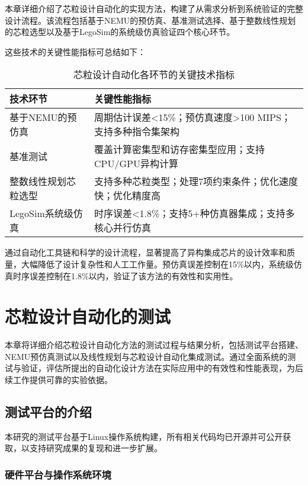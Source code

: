\documentclass[bachelor]{thesis-uestc}
\begin{document}
本章详细介绍了芯粒设计自动化的实现方法，构建了从需求分析到系统验证的完整设计流程。该流程包括基于NEMU的预仿真、基准测试选择、基于整数线性规划的芯粒选型以及基于LegoSim的系统级仿真验证四个核心环节。

这些技术的关键性能指标可总结如下：

\begin{table}[htbp]
\caption{芯粒设计自动化各环节的关键技术指标}
\centering
\begin{tabular}{|l|p{10cm}|}
\hline
\textbf{技术环节} & \textbf{关键性能指标} \\
\hline
基于NEMU的预仿真 & 周期估计误差<15\%；预仿真速度>100 MIPS；支持多种指令集架构 \\
\hline
基准测试 & 覆盖计算密集型和访存密集型应用；支持CPU/GPU异构计算 \\
\hline
整数线性规划芯粒选型 & 支持多种芯粒类型；处理7项约束条件；优化速度快；优化精度高\\
\hline
LegoSim系统级仿真 & 时序误差<1.8\%；支持5+种仿真器集成；支持多核心并行仿真 \\
\hline
\end{tabular}
\label{tab:key_metrics}
\end{table}

通过自动化工具链和科学的设计流程，显著提高了异构集成芯片的设计效率和质量，大幅降低了设计复杂性和人工工作量。预仿真误差控制在15\%以内，系统级仿真时序误差控制在1.8\%以内，验证了该方法的有效性和实用性。



\chapter{芯粒设计自动化的测试}

本章将详细介绍芯粒设计自动化方法的测试过程与结果分析，包括测试平台搭建、NEMU预仿真测试以及线性规划与芯粒设计自动化集成测试。通过全面系统的测试与验证，评估所提出的自动化设计方法在实际应用中的有效性和性能表现，为后续工作提供可靠的实验依据。

\section{测试平台的介绍}

本研究的测试平台基于Linux操作系统构建，所有相关代码均已开源并可公开获取，以支持研究成果的复现和进一步扩展。

\subsection{硬件平台与操作系统环境}
\end{document}
